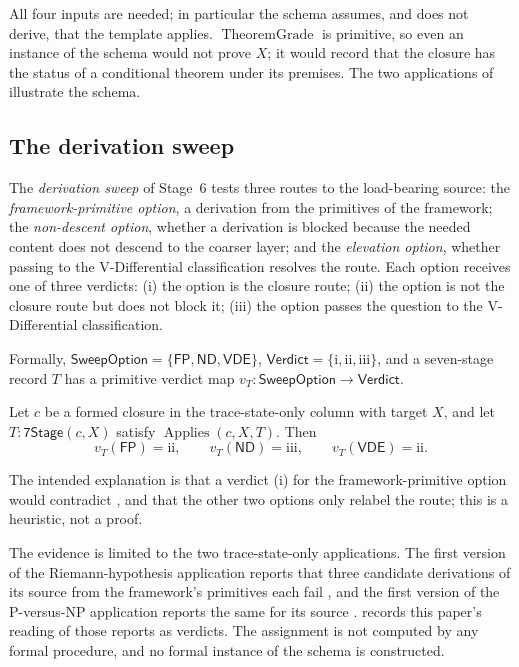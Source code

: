 All four inputs are needed; in particular the schema assumes, and does
not derive, that the template applies.  \(\operatorname{TheoremGrade}\)
is primitive, so even an instance of the schema would not prove \(X\);
it would record that the closure has the status of a conditional
theorem under its premises.  The two applications of
 illustrate the schema.

\subsection{The derivation sweep}\label{sec:recognition:verdict-signature}

\begin{definition}\label{def:three-option-sweep}
The \emph{derivation sweep} of Stage~6 tests three routes to the
load-bearing source: the \emph{framework-primitive option}, a
derivation from the primitives of the framework; the \emph{non-descent
option}, whether a derivation is blocked because the needed content
does not descend to the coarser layer; and the \emph{elevation option},
whether passing to the V-Differential classification resolves the
route.  Each option receives one of three verdicts: (i) the option is
the closure route; (ii) the option is not the closure route but does
not block it; (iii) the option passes the question to the
V-Differential classification.
\end{definition}

Formally, \(\mathsf{SweepOption}=\{\mathsf{FP},\mathsf{ND},\mathsf{VDE}\}\),
\(\mathsf{Verdict}=\{\mathrm{i},\mathrm{ii},\mathrm{iii}\}\), and a
seven-stage record \(T\) has a primitive verdict map
\(v_{T}:\mathsf{SweepOption}\to\mathsf{Verdict}\).

\begin{schema}\label{thm:verdict-signature}
Let \(c\) be a formed closure in the trace-state-only column with
target \(X\), and let \(T:\mathsf{7Stage}(c,X)\) satisfy
\(\operatorname{Applies}(c,X,T)\).  Then
\[
  v_T(\mathsf{FP})=\mathrm{ii},\qquad
  v_T(\mathsf{ND})=\mathrm{iii},\qquad
  v_T(\mathsf{VDE})=\mathrm{ii}.
\]
\end{schema}

The intended explanation is that a verdict (i) for the
framework-primitive option would contradict
, and that the other two options only
relabel the route; this is a heuristic, not a proof.

The evidence is limited to the two trace-state-only applications.  The
first version of the Riemann-hypothesis application reports that three
candidate derivations of its source from the framework's primitives
each fail \cite{Tsiokos2026RHvOne}, and the first version of the
P-versus-NP application reports the same for its source
\cite{Tsiokos2026PvNPvOne}.
 records this paper's reading of those
reports as verdicts.  The assignment is not computed by any formal
procedure, and no formal instance of the schema is constructed.

